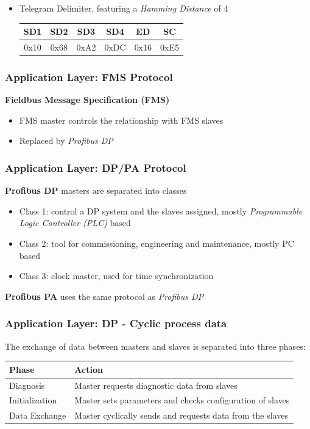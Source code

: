 \documentclass{beamer}
\begin{document}
\begin{frame}
\begin{itemize}
      \hfill \\
    \item Telegram Delimiter, featuring a \textit{Hamming Distance} of 4 \\
      \footnotesize
      \begin{tabular}[h]{|c|c|c|c|c|c|}
        \hline
        SD1   & SD2   & SD3   & SD4   & ED    & SC \\
        \hline
        0x10  & 0x68  & 0xA2  & 0xDC  & 0x16  & 0xE5 \\
        \hline
      \end{tabular}
      \normalsize
  \end{itemize}
\end{frame}

\begin{frame}
  \frametitle{Application Layer: FMS Protocol}
  \textbf{Fieldbus Message Specification (FMS)}
  \begin{itemize}
    \item FMS master controls the relationship with FMS slaves
    \item Replaced by \textit{Profibus DP}
  \end{itemize}
\end{frame}

\begin{frame}
  \frametitle{Application Layer: DP/PA Protocol}
  \textbf{Profibus DP} masters are separated into classes
  \begin{itemize}
    \item Class 1: control a DP system and the slaves assigned, mostly
      \textit{Programmable Logic Controller (PLC)} based
    \item Class 2: tool for commissioning, engineering and maintenance, mostly PC
      based
    \item Class 3: clock master, used for time synchronization
  \end{itemize}
  \vspace{10pt}
  \textbf{Profibus PA} uses the same protocol as \textit{Profibus DP}
\end{frame}

\begin{frame}
  \frametitle{Application Layer: DP - Cyclic process data}
  The exchange of data between masters and slaves is separated into three
  phases:~\cite{profibusmanual}
  \begin{center}
    \footnotesize
    \begin{tabular}[h]{l|l}
      \textbf{Phase}  & \textbf{Action} \\
      \hline
      Diagnosis       & Master requests diagnostic data from slaves \\
      Initialization  & Master sets parameters and checks configuration of slaves \\
      Data Exchange   & Master cyclically sends and requests data from the slaves
    \end{tabular}
  \end{center}
\end{frame}
\end{document}
